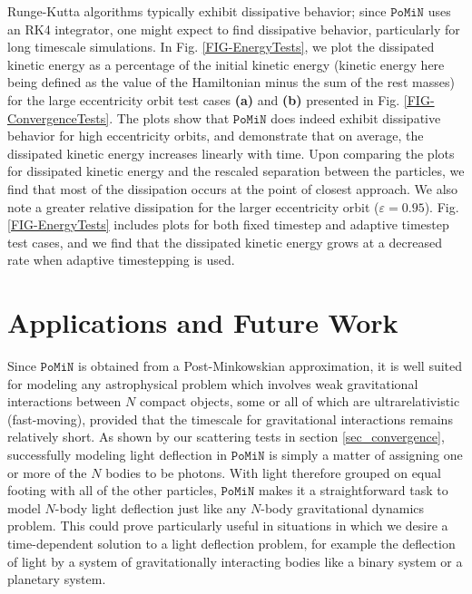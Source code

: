 \documentclass[aps,onecolumn,notitlepage,eqsecnum,nofootinbib,floatfix,superscriptaddress]{revtex4-1}
\newcommand{\codename}{\mathtt{PoMiN}}
\begin{document}
Runge-Kutta algorithms typically exhibit dissipative behavior; since $\codename$ uses an RK4 integrator, one might expect to find dissipative behavior, particularly for long timescale simulations. In Fig. \ref{FIG-EnergyTests}, we plot the dissipated kinetic energy as a percentage of the initial kinetic energy (kinetic energy here being defined as the value of the Hamiltonian minus the sum of the rest masses) for the large eccentricity orbit test cases \textbf{(a)} and \textbf{(b)} presented in Fig. \ref{FIG-ConvergenceTests}. The plots show that $\codename$ does indeed exhibit dissipative behavior for high eccentricity orbits, and demonstrate that on average, the dissipated kinetic energy increases linearly with time. Upon comparing the plots for dissipated kinetic energy and the rescaled separation between the particles, we find that most of the dissipation occurs at the point of closest approach. We also note a greater relative dissipation for the larger eccentricity orbit ($\varepsilon = 0.95$). Fig. \ref{FIG-EnergyTests} includes plots for both fixed timestep and adaptive timestep test cases, and we find that the dissipated kinetic energy grows at a decreased rate when adaptive timestepping is used. 



\section{Applications and Future Work}
Since $\codename$ is obtained from a Post-Minkowskian approximation, it is well suited for modeling any astrophysical problem which involves weak gravitational interactions between $N$ compact objects, some or all of which are ultrarelativistic (fast-moving), provided that the timescale for gravitational interactions remains relatively short. As shown by our scattering tests in section \ref{sec_convergence}, successfully modeling light deflection in $\codename$ is simply a matter of assigning one or more of the $N$ bodies to be photons.  With light therefore grouped on equal footing with all of the other particles, $\codename$ makes it a straightforward task to model $N$-body light deflection just like any $N$-body gravitational dynamics problem.  This could prove particularly useful in situations in which we desire a time-dependent solution to a light deflection problem, for example the deflection of light by a system of gravitationally interacting bodies like a binary system or a planetary system.  
\end{document}

